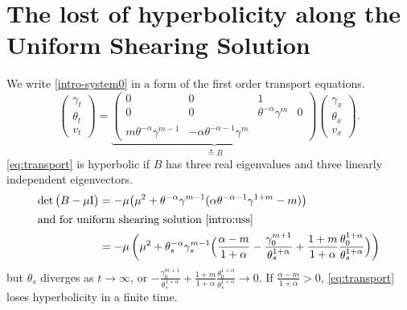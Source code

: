 \documentclass[a4paper,11pt]{article}
\begin{document}
\section{The lost of hyperbolicity along the Uniform Shearing Solution} \label{append:hadamard}
We write \eqref{intro-system0} in a form of the first order transport equations.
\begin{equation} \label{eq:transport}
 \begin{pmatrix} \gamma_t \\ \theta_t \\ v_t \end{pmatrix} = \underbrace{
 \begin{pmatrix}
  0 & 0 & 1\\
  0 & 0 & \theta^{-\alpha}\gamma^m & 0\\
  m\theta^{-\alpha}\gamma^{m-1} & -\alpha\theta^{-\alpha-1}\gamma^m & \end{pmatrix}}_\text{$\triangleq B$}
  \begin{pmatrix} \gamma_x \\ \theta_x \\ v_x \end{pmatrix}. 
\end{equation}
\eqref{eq:transport} is hyperbolic if $B$ has three real eigenvalues and three linearly independent eigenvectors.
\begin{align*}
 \det\big(B-\mu\textrm{I}\big) &= -\mu\big(\mu^2+\theta^{-\alpha}\gamma^{m-1}(\alpha \theta^{-\alpha-1}\gamma^{1+m} - m)\big)\\
 \intertext{and for uniform shearing solution \eqref{intro:uss}}
 &=-\mu\left(\mu^2+\theta_s^{-\alpha}\gamma_s^{m-1}\Big(\frac{\alpha-m}{1+\alpha}- \frac{\gamma_0^{m+1}}{\theta_s^{1+\alpha}} +\frac{1+m}{1+\alpha}\frac{\theta_0^{1+\alpha}}{\theta_s^{1+\alpha}}\Big)\right)
\end{align*}
but $\theta_s$ diverges as $t \rightarrow \infty$, or $\displaystyle - \frac{\gamma_0^{m+1}}{\theta_s^{1+\alpha}} +\frac{1+m}{1+\alpha}\frac{\theta_0^{1+\alpha}}{\theta_s^{1+\alpha}} \rightarrow 0$. If $\displaystyle \frac{\alpha-m}{1+\alpha}>0$, \eqref{eq:transport} loses hyperbolicity in a finite time.
\end{document}
